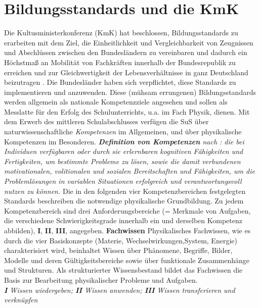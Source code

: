 
\section{Bildungsstandards und die KmK}\label{KmK}
Die Kultusministerkonferenz (KmK) hat beschlossen, Bildungsstandards zu erarbeiten mit dem Ziel, die Einheitlichkeit und Vergleichbarkeit von Zeugnissen und Abschl{\"u}ssen zwischen den Bundesl{\"a}ndern zu vereinbaren und dadurch ein H{\"o}chstma{\ss} an Mobilit{\"a}t von Fachkr{\"a}ften innerhalb der Bundesrepublik zu erreichen und  zur Gleichwertigkeit der Lebensverh{\"a}ltnisse in ganz Deutschland beizutragen \autocite{KMK}. Die Bundesl{\"a}nder haben sich verpflichtet, diese Standards zu implementieren und anzuwenden. Diese (m{\"u}hsam errungenen) Bildungsstandards werden allgemein als nationale Kompetenzziele angesehen und sollen als Messlatte f{\"u}r den Erfolg des Schulunterrichts, u.a. im Fach Physik, dienen. 
\mip
Mit dem Erwerb des mittleren Schulabschlusses verf{\"u}gen die SuS {\"u}ber naturwissenschaftliche \emph{Kompetenzen} im Allgemeinen, und {\"u}ber physikalische Kompetenzen im Besonderen. 
\mip
\leftskip=0.5cm \rightskip=0.5cm {\emph{{\textbf{Definition von Kompetenzen}} nach \textcite{Weinert}: die bei Individuen verf{\"u}gbaren oder durch sie erlernbaren kognitiven F{\"a}higkeiten und Fertigkeiten, um bestimmte Probleme zu 
l{\"o}sen, sowie die damit verbundenen motivationalen, volitionalen und sozialen Bereitschaften und F{\"a}higkeiten, um die Probleml{\"o}sungen in variablen Situationen erfolgreich und verantwortungsvoll nutzen zu k{\"o}nnen.}} 
\mip
\leftskip=0cm \rightskip=0cm Die in den folgenden vier Kompetenzbereichen festgelegten Standards beschreiben die notwendige physikalische Grundbildung. Zu jedem Kompetenzbereich sind drei Anforderungsbereiche  (= Merkmale von Aufgaben, die verschiedene Schwierigkeitsgrade innerhalb ein und derselben Kompetenz abbilden), \textbf{I}, \textbf{II}, \textbf{III}, angegeben. 
\mip
{\textbf{Fachwissen}} \tabto{7em} \hangindent=2.7cm Physikalisches Fachwissen, wie es durch die vier Basiskonzepte (Materie, Wechselwirkungen,System, Energie) charakterisiert wird, beinhaltet Wissen {\"u}ber Ph{\"a}nomene, Begriffe, Bilder, Modelle und deren G{\"u}ltigkeitsbereiche sowie {\"u}ber funktionale Zusammenh{\"a}nge und Strukturen. Als strukturierter Wissensbestand bildet das Fachwissen die Basis zur Bearbeitung physikalischer Probleme und Aufgaben. \\ \emph{\textbf{I} Wissen wiedergeben; \textbf{II} Wissen anwenden; \textbf{III} Wissen transferieren und verkn{\"u}pfen}
